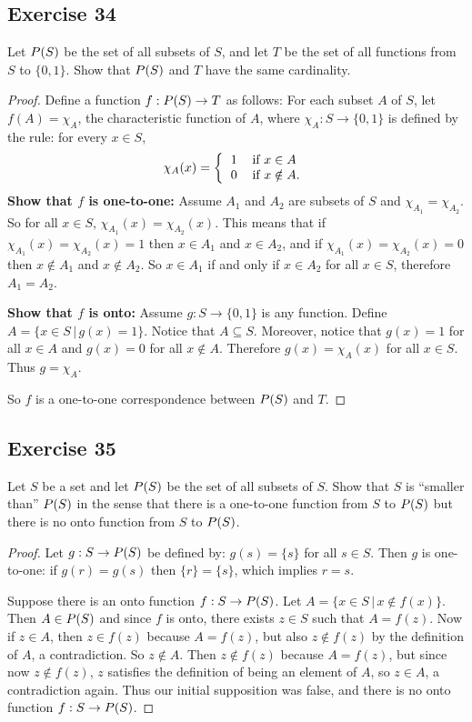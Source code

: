 \documentclass[14pt]{extarticle}
\let\mathscr\relax
\newcommand{\ps}{\mathscr{P}} %
\begin{document}
\subsection{Exercise 34}
Let \(\ps(S)\) be the set of all subsets of $S$, and let $T$ be the set of all functions from $S$ to \(\{0,1\}\). 
Show that \(\ps(S)\) and $T$ have the same cardinality.

\begin{proof}
Define a function \(f: \ps(S) \to T\) as follows: For each subset $A$ of $S$, let \(f(A)=\chi_A\), the characteristic 
function of $A$, where \(\chi_A: S \to \{0, 1\}\) is defined by the rule: for every \(x \in S\),
\[
\chi_A(x) =
\left\{
\begin{tabular}{ll}
1 & if \(x \in A\) \\
0 & if \(x \notin A\).
\end{tabular}
\right.
\]
{\bf Show that $f$ is one-to-one:} Assume $A_1$ and $A_2$ are subsets of $S$ and \(\chi_{A_1} = \chi_{A_2}\). So for
all \(x \in S\), \(\chi_{A_1}(x) = \chi_{A_2}(x)\). This means that if \(\chi_{A_1}(x) = \chi_{A_2}(x) = 1\) then
\(x \in A_1\) and \(x \in A_2\), and if \(\chi_{A_1}(x) = \chi_{A_2}(x) = 0\) then \(x \notin A_1\) and \(x \notin 
A_2\). So \(x \in A_1\) if and only if \(x \in A_2\) for all \(x \in S\), therefore \(A_1 = A_2\).

{\bf Show that $f$ is onto:} Assume \(g: S \to \{0, 1\}\) is any function. Define \(A = \{x \in S \, | \, g(x)=1\}\).
Notice that \(A \subseteq S\). Moreover, notice that \(g(x) = 1\) for all \(x \in A\) and \(g(x) = 0\) for all 
\(x \notin A\). Therefore \(g(x) = \chi_A(x)\) for all \(x \in S\). Thus \(g = \chi_A\).

So $f$ is a one-to-one correspondence between \(\ps(S)\) and $T$.
\end{proof}

\subsection{Exercise 35}
Let $S$ be a set and let \(\ps(S)\) be the set of all subsets of $S$. Show that $S$ is “smaller than” \(\ps(S)\) 
in the sense that there is a one-to-one function from $S$ to \(\ps(S)\) but there is no onto function from $S$ to 
\(\ps(S)\).

\begin{proof}
Let \(g: S \to \ps(S)\) be defined by: \(g(s) = \{s\}\) for all \(s \in S\). Then $g$ is one-to-one: if \(g(r) = g(s)\)
then \(\{r\} = \{s\}\), which implies $r = s$.

Suppose there is an onto function \(f: S \to \ps(S)\). Let \(A = \{x\in S\,|\, x\notin f(x)\}\). Then \(A \in \ps(S)\) 
and since $f$ is onto, there exists \(z \in S\) such that \(A = f(z)\). Now if \(z \in A\), then \(z \in f(z)\) 
because \(A = f(z)\), but also \(z \notin f(z)\) by the definition of $A$, a contradiction. So \(z \notin A\). Then 
\(z \notin f(z)\) because \(A = f(z)\), but since now \(z \notin f(z)\), $z$ satisfies the definition of being an 
element of $A$, so \(z \in A\), a contradiction again. Thus our initial supposition was false, and there is no onto function \(f: S \to \ps(S)\).
\end{proof}
\end{document}
